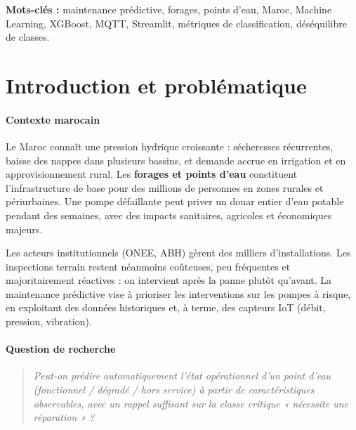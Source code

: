 \documentclass[11pt,a4paper]{report}
\begin{document}
\textbf{Mots-clés :} maintenance prédictive, forages, points d'eau, Maroc, Machine Learning, XGBoost, MQTT, Streamlit, métriques de classification, déséquilibre de classes.





\chapter{Introduction et problématique}



\subsubsection{Contexte marocain}



Le Maroc connaît une pression hydrique croissante : sécheresses récurrentes, baisse des nappes dans plusieurs bassins, et demande accrue en irrigation et en approvisionnement rural. Les \textbf{forages et points d'eau} constituent l'infrastructure de base pour des millions de personnes en zones rurales et périurbaines. Une pompe défaillante peut priver un douar entier d'eau potable pendant des semaines, avec des impacts sanitaires, agricoles et économiques majeurs.



Les acteurs institutionnels (ONEE, ABH) gèrent des milliers d'installations. Les inspections terrain restent néanmoins coûteuses, peu fréquentes et majoritairement réactives : on intervient après la panne plutôt qu'avant. La maintenance prédictive vise à prioriser les interventions sur les pompes à risque, en exploitant des données historiques et, à terme, des capteurs IoT (débit, pression, vibration).



\subsubsection{Question de recherche}



\begin{quote}

\textit{Peut-on prédire automatiquement l'état opérationnel d'un point d'eau (fonctionnel / dégradé / hors service) à partir de caractéristiques observables, avec un rappel suffisant sur la classe critique « nécessite une réparation » ?}

\end{quote}
\end{document}
